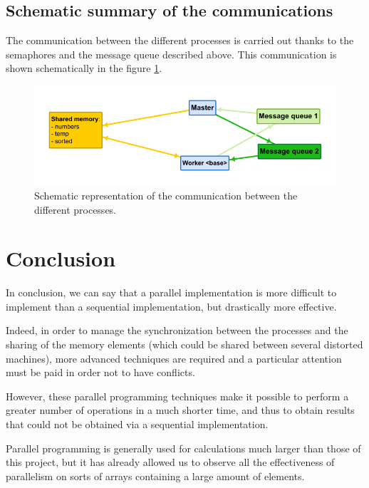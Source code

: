 \documentclass[a4paper, 12pt]{article}
\begin{document}
	\subsection{Schematic summary of the communications}
	The communication between the different processes is carried out thanks to the semaphores and the message queue described above. This communication is shown schematically in the figure \ref{fig:communication_processes}.
	
	\begin{figure}[!ht]
	    \centering
	    \includegraphics[width=\textwidth]{resources/pdf/communication.pdf}
	    \caption{Schematic representation of the communication between the different processes.}
	    \label{fig:communication_processes}
	\end{figure}
	
	
	\section{Conclusion}
	In conclusion, we can say that a parallel implementation is more difficult to implement than a sequential implementation, but drastically more effective.\par
	
	Indeed, in order to manage the synchronization between the processes and the sharing of the memory elements (which could be shared between several distorted machines), more advanced techniques are required and a particular attention must be paid in order not to have conflicts.\par
	
	However, these parallel programming techniques make it possible to perform a greater number of operations in a much shorter time, and thus to obtain results that could not be obtained via a sequential implementation.\par
	
	Parallel programming is generally used for calculations much larger than those of this project, but it has already allowed us to observe all the effectiveness of parallelism on sorts of arrays containing a large amount of elements.
\end{document}
